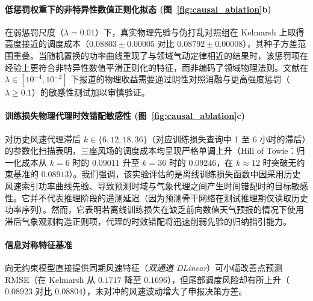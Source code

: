 \paragraph{低惩罚权重下的非特异性数值正则化拟态 (图~\ref{fig:causal_ablation}b)}
在弱惩罚尺度（$\lambda = 0.01$）下，真实物理先验与伪打乱对照组在 Kelmarsh 上取得高度接近的调度成本（$0.08803 \pm 0.00005$ 对比 $0.08792 \pm 0.00008$），其种子方差范围重叠。当随机置换的功率曲线重现了与领域气动定律相近的结果时，该惩罚项在经验上更符合非特异性数值平滑正则化的特征，而非编码了领域物理法则。文献在 $\lambda \in [10^{-4}, 10^{-2}]$ 下报道的物理收益需要通过阴性对照消融与更高强度惩罚（$\lambda \ge 0.1$）的敏感性测试加以审慎验证。

\paragraph{训练损失物理代理时效错配敏感性 (图~\ref{fig:causal_ablation}c)}
对历史风速代理滞后 $k \in \{6, 12, 18, 36\}$（对应训练损失查询中 1 至 6 小时的滞后）的参数化扫描表明，三座风场的调度成本均呈现严格单调上升（Hill of Towie：归一化成本从 $k=6$ 时的 $0.09011$ 升至 $k=36$ 时的 $0.09246$，在 $k \approx 12$ 时突破无约束基准的 $0.08913$）。我们强调，该实验评估的是离线训练损失函数中因采用历史风速索引功率曲线先验、导致预测时域与气象代理之间产生时间错配时的目标敏感性。它并不代表推理阶段的遥测延迟（因为预测骨干网络在测试推理期仅读取历史功率序列）。然而，它表明若离线训练损失在缺乏前向数值天气预报的情况下使用滞后气象观测构造正则项，代理的时效错配将迅速削弱先验的归纳指引能力。

\paragraph{信息对称特征基准}
向无约束模型直接提供同期风速特征（\textit{双通道 DLinear}）可小幅改善点预测 RMSE（在 Kelmarsh 从 $0.1717$ 降至 $0.1696$），但尾部调度风险却有所上升（$0.08923$ 对比 $0.08804$），未对冲的风速波动增大了申报决策方差。

